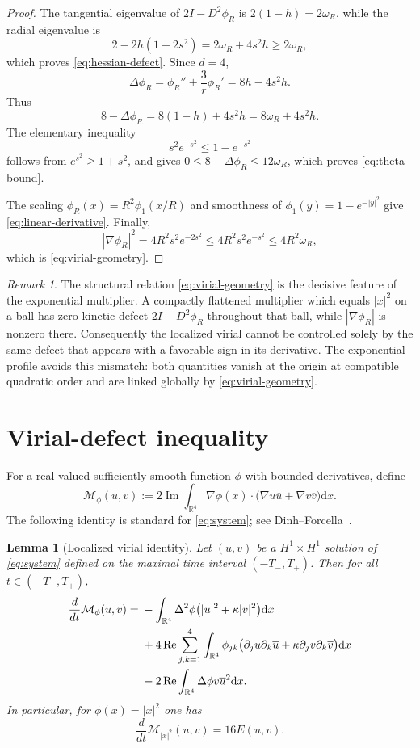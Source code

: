 \documentclass[12pt]{amsart}
\numberwithin{equation}{section}
\newtheorem{lemma}[theorem]{Lemma}
\theoremstyle{remark}
\newtheorem{remark}[theorem]{Remark}
\newcommand{\R}{\mathbb{R}}
\newcommand{\dd}{\mathrm{d}x}
\newcommand{\im}{\operatorname{Im}}
\newcommand{\re}{\operatorname{Re}}
\begin{document}
\begin{proof}
The tangential eigenvalue of $2I-D^2\phi_R$ is $2(1-h)=2\omega_R$, while the radial eigenvalue is
\[
 2-2h(1-2s^2)=2\omega_R+4s^2h\ge2\omega_R,
\]
which proves \eqref{eq:hessian-defect}.  Since $d=4$,
\[
 \Delta\phi_R=\phi_R''+\frac3r\phi_R'=8h-4s^2h.
\]
Thus
\[
8-\Delta \phi_R=8(1-h)+4s^2h=8\omega_R+4s^2h.
\]
The elementary inequality
\begin{equation*}
 s^2e^{-s^2}\le1-e^{-s^2}
\end{equation*}
follows from $e^{s^2}\ge1+s^2$, and gives $0\le 8-\Delta \phi_R \le12\omega_R$, which proves \eqref{eq:theta-bound}.

The scaling $\phi_R(x)=R^2\phi_1(x/R)$ and smoothness of $\phi_1(y)=1-e^{-|y|^2}$ give \eqref{eq:linear-derivative}.  Finally,
\[
 |\nabla\phi_R|^2=4R^2s^2e^{-2s^2} \le4R^2s^2e^{-s^2} \le4R^2\omega_R,
\]
which is \eqref{eq:virial-geometry}.
\end{proof}

\begin{remark}\label{rem:why-exp}
The structural relation \eqref{eq:virial-geometry} is the decisive feature of the exponential multiplier.  A compactly flattened multiplier which equals $|x|^2$ on a ball has zero kinetic defect $2I-D^2\phi_R$ throughout that ball, while $|\nabla\phi_R|$ is nonzero there.  Consequently the localized virial cannot be controlled solely by the same defect that appears with a favorable sign in its derivative.  The exponential profile avoids this mismatch: both quantities vanish at the origin at compatible quadratic order and are linked globally by \eqref{eq:virial-geometry}.
\end{remark}

\section{Virial-defect inequality}\label{sec:coercive}
For a real-valued sufficiently smooth function $\phi$ with bounded derivatives, define
\begin{equation}\label{eq:Mphi}
 \mathcal M_\phi(u,v) :=2\im\int_{\R^4}\nabla\phi(x)\cdot
 \big(\nabla u\overline u+\nabla v\overline v\big)\dd.
\end{equation}
The following identity is standard for \eqref{eq:system}; see Dinh--Forcella~\cite[Section 4]{DF}.

\begin{lemma}[Localized virial identity]\label{lem:virial-id}
Let $(u,v)$ be a $H^1\times H^1$ solution of \eqref{eq:system} defined on the maximal time interval $(-T_-,T_+)$. Then for all $t\in (-T_-, T_+)$,
\begin{align}
 \frac{d}{dt}\mathcal M_\phi(u,v)
 ={}&-\int_{\R^4}\Delta^2\phi\big(|u|^2+\kappa|v|^2\big)\dd\label{eq:virial-id}\\
 &+4\re\sum_{j,k=1}^4\int_{\R^4}\phi_{jk}
 \big(\partial_ju \partial_k\overline u + \kappa \partial_jv \partial_k\overline v\big)\dd\notag\\
 &-2\re\int_{\R^4}\Delta \phi v\overline u^{2}\dd.\notag
\end{align}
In particular, for $\phi(x)=|x|^2$ one has
\[
 \frac{d}{dt}\mathcal M_{|x|^2}(u,v)=16E(u,v).
\]
\end{lemma}
\end{document}
